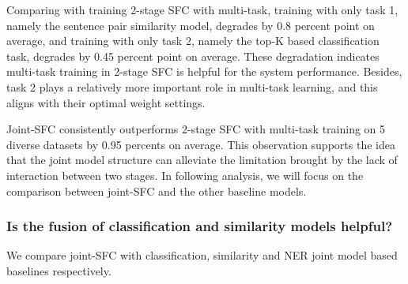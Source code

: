 Comparing with training 2-stage SFC with multi-task, training with only task
1,  namely the sentence pair similarity model, degrades by 0.8 percent
point  on average, and training with only task 2, namely the top-K based
classification  task,  degrades  by  0.45  percent  point  on  average.  These
degradation  indicates  multi-task training in 2-stage SFC is helpful for the
system  performance.  Besides, task 2 plays a relatively more important role in
multi-task learning, and this aligns with their optimal weight settings.

Joint-SFC consistently outperforms 2-stage SFC with multi-task training  
on 5 diverse datasets by 0.95 percents  on  average. 
This observation supports the idea that the joint model
structure  can  alleviate  the  limitation  brought by the lack of interaction
between  two  stages.  In  following analysis, we will focus on the comparison
between joint-SFC and the other baseline models.

\subsubsection*{Is  the  fusion of classification and similarity models
helpful?}  We  compare  joint-SFC with classification, similarity and NER joint model based baselines respectively.

\begin{table}
  \begin{centering}
  \end{centering}
  \caption{
    We  show the performances of SFC from different settings of
    hyperparameters, $K$  denoting the candidate class number from stage 1,
    $P$ denoting the number of sampled sentence pair in stage 2. 
  }
  \label{tbe:table3}
\end{table}

